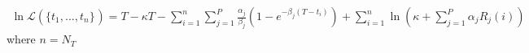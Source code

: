 \documentclass{article}
\begin{document}
$\begin{array}{l}
  \ln \mathcal{L} ( \{ t_1, \ldots, t_n \}_{}) = T - \kappa T - \sum_{i = 1}^n
  \sum_{j = 1}^P \frac{\alpha_j}{\beta_j} ( 1 - e^{- \beta_j ( T - t_i)}) +
  \sum_{i = 1}^n \ln \left( \kappa + \sum_{j = 1}^P \alpha_j R_j ( i) \right)
\end{array}$where $n = N_T$
\end{document}
